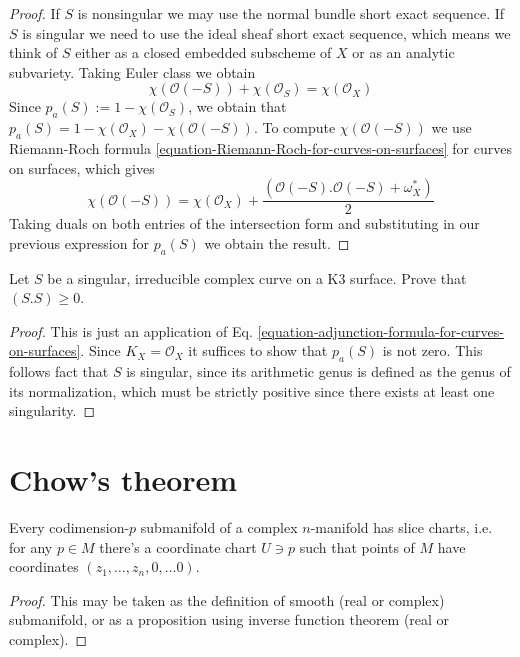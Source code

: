 \begin{proof}
If $S$ is nonsingular we may use the normal bundle short exact sequence. If
$S$ is singular we need to use the ideal sheaf short exact sequence, which means
we think of $S$ either as a closed embedded subscheme of $X$ or as an analytic 
subvariety. Taking Euler class we obtain
$$
\chi(\mathcal{O}(-S))+\chi(\mathcal{O}_S)=\chi(\mathcal{O}_X)
$$
Since $p_a(S):=1-\chi(\mathcal{O}_S)$, we obtain that
$p_a(S)=1-\chi(\mathcal{O}_X)-\chi(\mathcal{O}(-S))$. To compute
$\chi(\mathcal{O}(-S))$ we use Riemann-Roch formula
\ref{equation-Riemann-Roch-for-curves-on-surfaces} for curves on surfaces, which
gives
$$
\chi(\mathcal{O}(-S))=\chi(\mathcal{O}_X)
+\frac{(\mathcal{O}(-S).\mathcal{O}(-S)+\omega_X^*)}{2}
$$
Taking duals on both entries of the intersection form and substituting in our
previous expression for $p_a(S)$ we obtain the result.
\end{proof}

\begin{exercise}
\label{exercise-singular-curve-on-K3-has-positive-self-intersection}
Let $S$ be a singular, irreducible complex curve on a K3 surface. Prove that
$(S.S)\geq 0$.
\end{exercise}

\begin{proof}
This is just an application of Eq.
\ref{equation-adjunction-formula-for-curves-on-surfaces}. Since
$K_X=\mathcal{O}_X$ it suffices to show that $p_a(S)$ is not zero. This follows
fact that $S$ is singular, since its arithmetic genus is defined as the genus of
its normalization, which must be strictly positive since there exists at least
one singularity.
\end{proof}

\section{Chow's theorem}
\label{section-chow-theorem}

\begin{proposition}
\label{proposition-slice-charts}
Every codimension-$p$ submanifold of a complex $n$-manifold has slice charts,
i.e. for any $p \in M$ there's a coordinate chart $U \ni p$ such that points of
$M$ have coordinates $(z_1,\ldots,z_n,0,\ldots 0)$.
\end{proposition}

\begin{proof}
This may be taken as the definition of smooth (real or complex) submanifold, or
as a proposition using inverse function theorem (real or complex).
\end{proof}

